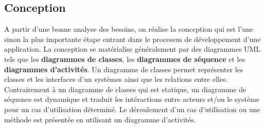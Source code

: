     \subsection{Conception}
    A partir d’une bonne analyse des besoins, on réalise la conception qui est l’une sinon la plus importante étape entrant dans le processus de développement d’une application. La conception se matérialise généralement par des diagrammes UML tels que les \textbf{diagrammes de classes}, les \textbf{diagrammes de séquence} et les \textbf{diagrammes d'activités}. Un diagramme de classes permet représenter les classes et les interfaces d'un systèmes ainsi que les relations entre elles. Contrairement à un diagramme de classes qui est statique, un diagramme de séquence est dynamique et traduit les intéractions entre acteurs et/ou le système pour un cas d'utilisation déterminé. Le déroulement d'un cas d'utilisation ou une méthode est présentée en utilisant un diagramme d'activités.
    

